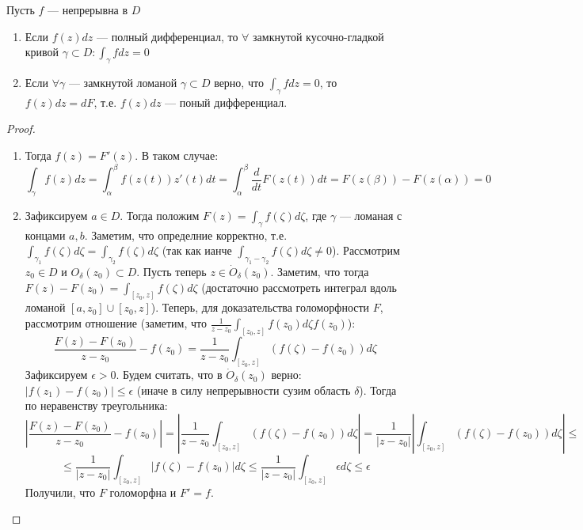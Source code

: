 \begin{theorem}
    Пусть \(f\) --- непрерывна в \(D\)
    \begin{enumerate}
        \item Если \(f(z)dz\) --- полный дифференциал, то \(\forall \) замкнутой кусочно-гладкой кривой \(\gamma \subset D: \int_\gamma fdz = 0\)
        \item Если \(\forall \gamma\) --- замкнутой ломаной \(\gamma \subset D\) верно, что \(\int_\gamma fdz = 0\), то \(f(z)dz = dF\), т.е. \(f(z)dz\) --- поный дифференциал.
    \end{enumerate}
\end{theorem}
\begin{proof}
    \begin{enumerate}
        \item Тогда \(f(z) = F'(z)\). В таком случае:
        \[\int_\gamma f(z)dz = \int_\alpha^\beta f(z(t))z'(t)dt = \int_\alpha^\beta\frac{d}{dt}F(z(t))dt = F(z(\beta)) - F(z(\alpha)) = 0\]
        \item Зафиксируем \(a \in D\). Тогда положим \(F(z) = \int_\gamma f(\zeta)d\zeta\), где \(\gamma\) --- ломаная с концами \(a, b\). Заметим, что определние корректно, т.е. \(\int_{\gamma_1} f(\zeta)d\zeta = \int_{\gamma_2} f(\zeta)d\zeta\) (так как ианче \(\int_{\gamma_1 - \gamma_2} f(\zeta)d\zeta \ne 0\)). Рассмотрим \(z_0 \in D\) и \(O_\delta(z_0) \subset D\). Пусть теперь \(z \in \dot O_\delta(z_0)\). Заметим, что тогда \(F(z) - F(z_0) = \int_{[z_0, z]}f(\zeta)d\zeta\) (достаточно рассмотреть интеграл вдоль ломаной \([a, z_0] \cup [z_0, z]\)). Теперь, для доказательства голоморфности \(F\), рассмотрим отношение (заметим, что \(\frac{1}{z - z_0}\int_{[z_0, z]}f(z_0)d\zeta f(z_0)\)):
        \[\frac{F(z) - F(z_0)}{z - z_0} - f(z_0) = \frac{1}{z - z_0}\int_{[z_0, z]} (f(\zeta) - f(z_0))d\zeta\]
        Зафиксируем \(\epsilon > 0\). Будем считать, что в \(\dot O_\delta(z_0)\) верно: \(|f(z_1) - f(z_0)| \le \epsilon\) (иначе в силу непрерывности сузим область \(\delta\)). Тогда по неравенству треугольника:
        \[\left| \frac{F(z) - F(z_0)}{z - z_0} - f(z_0) \right| = \left| \frac{1}{z - z_0}\int_{[z_0, z]} (f(\zeta) - f(z_0))d\zeta \right| = \frac{1}{|z - z_0|}\left|\int_{[z_0, z]} (f(\zeta) - f(z_0))d\zeta \right|\le\]
        \[\le \frac{1}{|z - z_0|}\int_{[z_0, z]} |f(\zeta) - f(z_0)|d\zeta \le \frac{1}{|z - z_0|}\int_{[z_0, z]} \epsilon d\zeta \le \epsilon\]
        Получили, что \(F\) голоморфна и \(F' = f\).
    \end{enumerate}
\end{proof}

